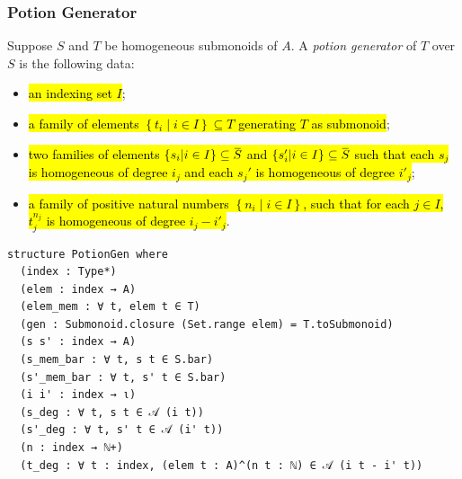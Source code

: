 \documentclass[9pt]{beamer}
\begin{document}
\begin{frame}[fragile]
  \frametitle{Potion Generator}
  Suppose $S$ and $T$ be homogeneous submonoids of $A$. A \emph{potion generator} of $T$ over $S$ is the following data:
\begin{itemize}
  \item {}\hl{an indexing set $I$};
  \item {}\hl{a family of elements $\left\{ t_i \middle| i \in I \right\} \subseteq T$ generating $T$ as submonoid};
  \item {}\hl{two families of elements $\left\{ s_i \middle| i \in I \right\} \subseteq \mybar{S}$ and  
  $\left\{ s_i' \middle| i \in I \right\} \subseteq \mybar{S}$ such that each $s_j$ is homogeneous of degree $i_j$ and 
  each $s_j'$ is homogeneous of degree $i'_j$};
  \item {}\hl{a family of positive natural numbers $\left\{ n_i\middle| i\in I \right\}$, such that for each $j \in I$,
  $t_j^{n_j}$ is homogeneous of degree $i_j - i'_j$}.
\end{itemize}
  
\begin{lstlisting}[extendedchars=true, caption={Potion Generator}, 
  linebackgroundcolor={%
  \ifnum\value{lstnumber}=2\color{yellow!10}\fi
  \ifnum\value{lstnumber}=3\color{red!10}\fi
  \ifnum\value{lstnumber}=4\color{red!10}\fi
  \ifnum\value{lstnumber}=5\color{red!10}\fi
  \ifnum\value{lstnumber}=6\color{blue!10}\fi
  \ifnum\value{lstnumber}=7\color{blue!10}\fi
  \ifnum\value{lstnumber}=8\color{blue!10}\fi
  \ifnum\value{lstnumber}=9\color{blue!10}\fi
  \ifnum\value{lstnumber}=10\color{blue!10}\fi
  \ifnum\value{lstnumber}=11\color{blue!10}\fi
  \ifnum\value{lstnumber}=12\color{green!10}\fi
  \ifnum\value{lstnumber}=13\color{green!10}\fi}, linebackgroundsep=-8pt, linebackgroundwidth=280pt,
  basicstyle=\ttfamily\footnotesize]
structure PotionGen where
  (index : Type*)
  (elem : index → A)
  (elem_mem : ∀ t, elem t ∈ T)
  (gen : Submonoid.closure (Set.range elem) = T.toSubmonoid)
  (s s' : index → A)
  (s_mem_bar : ∀ t, s t ∈ S.bar)
  (s'_mem_bar : ∀ t, s' t ∈ S.bar)
  (i i' : index → ι)
  (s_deg : ∀ t, s t ∈ 𝒜 (i t))
  (s'_deg : ∀ t, s' t ∈ 𝒜 (i' t))
  (n : index → ℕ+)
  (t_deg : ∀ t : index, (elem t : A)^(n t : ℕ) ∈ 𝒜 (i t - i' t))
\end{lstlisting}
\end{frame}
\end{document}
